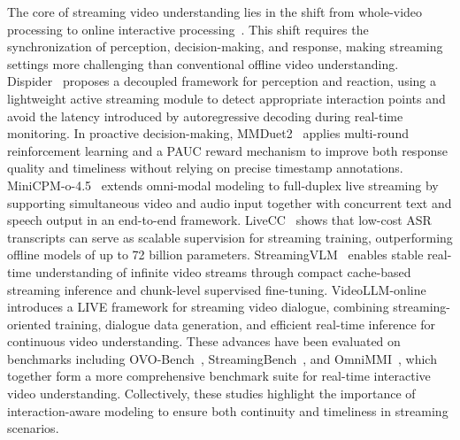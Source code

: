 The core of streaming video understanding lies in the shift from whole-video processing to online interactive processing~\citep{wang2025streambridge,xia2025streaming}. This shift requires the synchronization of perception, decision-making, and response, making streaming settings more challenging than conventional offline video understanding. Dispider~\citep{qian2025dispider} proposes a decoupled framework for perception and reaction, using a lightweight active streaming module to detect appropriate interaction points and avoid the latency introduced by autoregressive decoding during real-time monitoring. In proactive decision-making, MMDuet2~\citep{wang2025mmduet2} applies multi-round reinforcement learning and a PAUC reward mechanism to improve both response quality and timeliness without relying on precise timestamp annotations. MiniCPM-o-4.5~\citep{minicpmo45} extends omni-modal modeling to full-duplex live streaming by supporting simultaneous video and audio input together with concurrent text and speech output in an end-to-end framework. LiveCC~\citep{chen2025livecc} shows that low-cost ASR transcripts can serve as scalable supervision for streaming training, outperforming offline models of up to 72 billion parameters. StreamingVLM~\citep{xu2025streamingvlm} enables stable real-time understanding of infinite video streams through compact cache-based streaming inference and chunk-level supervised fine-tuning. VideoLLM-online~\citep{chen2024videollm} introduces a LIVE framework for streaming video dialogue, combining streaming-oriented training, dialogue data generation, and efficient real-time inference for continuous video understanding. These advances have been evaluated on benchmarks including OVO-Bench~\citep{niu2025ovo}, StreamingBench~\citep{lin2024streamingbench}, and OmniMMI~\citep{wang2025omnimmi}, which together form a more comprehensive benchmark suite for real-time interactive video understanding. Collectively, these studies highlight the importance of interaction-aware modeling to ensure both continuity and timeliness in streaming scenarios.

